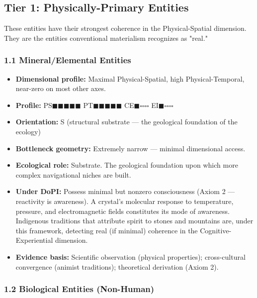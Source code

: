 \subsection*{Tier 1: Physically-Primary Entities}


These entities have their strongest coherence in the Physical-Spatial dimension. They are the entities conventional materialism recognizes as "real."


\subsubsection*{1.1 Mineral/Elemental Entities}

\begin{itemize}[nosep,leftmargin=*]
  \item \textbf{Dimensional profile:} Maximal Physical-Spatial, high Physical-Temporal, near-zero on most other axes.
  \item \textbf{Profile:} PS$\blacksquare$$\blacksquare$$\blacksquare$$\blacksquare$$\blacksquare$ PT$\blacksquare$$\blacksquare$$\blacksquare$$\blacksquare$$\blacksquare$ CE$\blacksquare$$\square$$\square$$\square$$\square$ EI$\blacksquare$$\square$$\square$$\square$$\square$
  \item \textbf{Orientation:} S (structural substrate — the geological foundation of the ecology)
  \item \textbf{Bottleneck geometry:} Extremely narrow — minimal dimensional access.
  \item \textbf{Ecological role:} Substrate. The geological foundation upon which more complex navigational niches are built.
  \item \textbf{Under DoPI:} Possess minimal but nonzero consciousness (Axiom 2 — reactivity is awareness). A crystal's molecular response to temperature, pressure, and electromagnetic fields constitutes its mode of awareness. Indigenous traditions that attribute spirit to stones and mountains are, under this framework, detecting real (if minimal) coherence in the Cognitive-Experiential dimension.
  \item \textbf{Evidence basis:} Scientific observation (physical properties); cross-cultural convergence (animist traditions); theoretical derivation (Axiom 2).
\end{itemize}


\subsubsection*{1.2 Biological Entities (Non-Human)}

